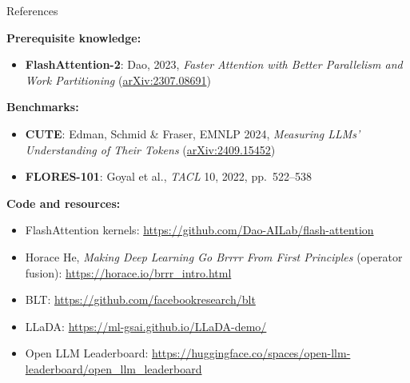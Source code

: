 \begin{frame}[allowframebreaks]{References}
\framebreak

    \textbf{Prerequisite knowledge:}
    \begin{itemize}
        \item \textbf{FlashAttention-2}: Dao, 2023, \emph{Faster Attention with Better Parallelism and Work Partitioning} (\href{https://arxiv.org/abs/2307.08691}{arXiv:2307.08691})
    \end{itemize}
\framebreak
    \textbf{Benchmarks:}
    \begin{itemize}
        \item \textbf{CUTE}: Edman, Schmid \& Fraser, EMNLP 2024, \emph{Measuring LLMs' Understanding of Their Tokens} (\href{https://arxiv.org/abs/2409.15452}{arXiv:2409.15452})
        \item \textbf{FLORES-101}: Goyal et al., \emph{TACL} 10, 2022, pp.~522--538
    \end{itemize}
    \vspace{0.5em}
    \textbf{Code and resources:}
    \begin{itemize}
        \item FlashAttention kernels: \url{https://github.com/Dao-AILab/flash-attention}
        \item Horace He, \emph{Making Deep Learning Go Brrrr From First Principles} (operator fusion): \url{https://horace.io/brrr_intro.html}
        \item BLT: \url{https://github.com/facebookresearch/blt}
        \item LLaDA: \url{https://ml-gsai.github.io/LLaDA-demo/}
        \item Open LLM Leaderboard: \url{https://huggingface.co/spaces/open-llm-leaderboard/open_llm_leaderboard}
    \end{itemize}
\end{frame}

